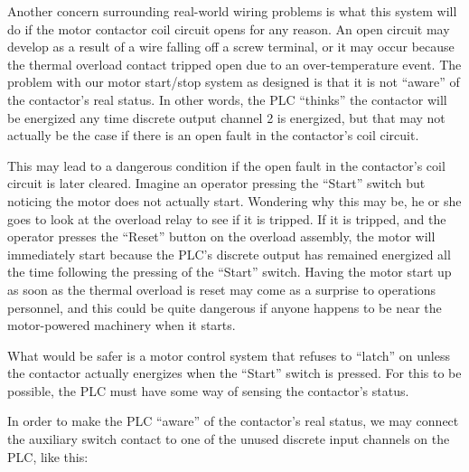 \vskip 10pt

Another concern surrounding real-world wiring problems is what this system will do if the motor contactor coil circuit opens for any reason.  An open circuit may develop as a result of a wire falling off a screw terminal, or it may occur because the thermal overload contact tripped open due to an over-temperature event.  The problem with our motor start/stop system as designed is that it is not ``aware'' of the contactor's real status.  In other words, the PLC ``thinks'' the contactor will be energized any time discrete output channel 2 is energized, but that may not actually be the case if there is an open fault in the contactor's coil circuit.

This may lead to a dangerous condition if the open fault in the contactor's coil circuit is later cleared.  Imagine an operator pressing the ``Start'' switch but noticing the motor does not actually start.  Wondering why this may be, he or she goes to look at the overload relay to see if it is tripped.  If it is tripped, and the operator presses the ``Reset'' button on the overload assembly, the motor will immediately start because the PLC's discrete output has remained energized all the time following the pressing of the ``Start'' switch.  Having the motor start up as soon as the thermal overload is reset may come as a surprise to operations personnel, and this could be quite dangerous if anyone happens to be near the motor-powered machinery when it starts.

What would be safer is a motor control system that refuses to ``latch'' on unless the contactor actually energizes when the ``Start'' switch is pressed.  For this to be possible, the PLC must have some way of sensing the contactor's status.

\filbreak

In order to make the PLC ``aware'' of the contactor's real status, we may connect the auxiliary switch contact to one of the unused discrete input channels on the PLC, like this:

